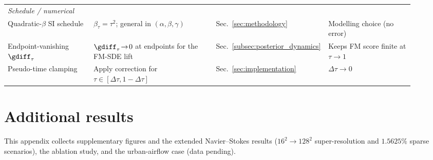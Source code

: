 \begin{table}[ht]
\begin{tabular}{p{0.21\linewidth} p{0.30\linewidth} p{0.20\linewidth} p{0.21\linewidth}}
        \midrule
        \multicolumn{4}{l}{\emph{Schedule / numerical}}\\
        Quadratic-$\beta$ SI schedule & $\beta_\tau=\tau^2$; general in $(\alpha,\beta,\gamma)$ & Sec.~\ref{sec:methodology} & Modelling choice (no error) \\
        Endpoint-vanishing $\gdiff_\tau$ & $\gdiff_\tau\!\to\!0$ at endpoints for the FM-SDE lift & Sec.~\ref{subsec:posterior_dynamics} & Keeps FM score finite at $\tau\to1$ \\
        Pseudo-time clamping & Apply correction for $\tau\in[\Delta\tau,1-\Delta\tau]$ & Sec.~\ref{sec:implementation} & $\Delta\tau\to0$ \\
        \bottomrule
    \end{tabular}
\end{table}

\section{Additional results}\label{appendix:additional_results}

This appendix collects supplementary figures and the extended Navier--Stokes results ($16^2\!\to\!128^2$ super-resolution and $1.5625\%$ sparse scenarios), the ablation study, and the urban-airflow case (data pending).

